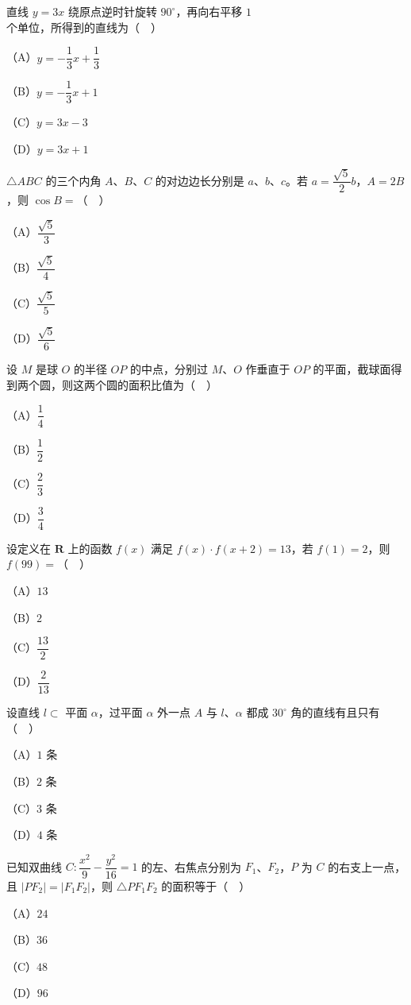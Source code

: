 \begin{question}
直线 $y=3x$ 绕原点逆时针旋转 $90^\circ$，再向右平移 $1$ 个单位，所得到的直线为（　）

（A）$y=-\dfrac13x+\dfrac13$

（B）$y=-\dfrac13x+1$

（C）$y=3x-3$

（D）$y=3x+1$

\end{question}
\begin{question}
$\triangle ABC$ 的三个内角 $A$、$B$、$C$ 的对边边长分别是 $a$、$b$、$c$。若 $a=\dfrac{\sqrt5}2b$，$A=2B$，则 $\cos B=$（　）

（A）$\dfrac{\sqrt5}3$

（B）$\dfrac{\sqrt5}4$

（C）$\dfrac{\sqrt5}5$

（D）$\dfrac{\sqrt5}6$

\end{question}
\begin{question}
设 $M$ 是球 $O$ 的半径 $OP$ 的中点，分别过 $M$、$O$ 作垂直于 $OP$ 的平面，截球面得到两个圆，则这两个圆的面积比值为（　）

（A）$\dfrac14$

（B）$\dfrac12$

（C）$\dfrac23$

（D）$\dfrac34$

\end{question}
\begin{question}
设定义在 $\mathbf R$ 上的函数 $f(x)$ 满足 $f(x)\cdot f(x+2)=13$，若 $f(1)=2$，则 $f(99)=$（　）

（A）$13$

（B）$2$

（C）$\dfrac{13}2$

（D）$\dfrac2{13}$

\end{question}
\begin{question}
设直线 $l\subset$ 平面 $\alpha$，过平面 $\alpha$ 外一点 $A$ 与 $l$、$\alpha$ 都成 $30^\circ$ 角的直线有且只有（　）

（A）$1$ 条

（B）$2$ 条

（C）$3$ 条

（D）$4$ 条

\end{question}
\begin{question}
已知双曲线 $C:\dfrac{x^2}9-\dfrac{y^2}{16}=1$ 的左、右焦点分别为 $F_1$、$F_2$，$P$ 为 $C$ 的右支上一点，且 $|PF_2|=|F_1F_2|$，则 $\triangle PF_1F_2$ 的面积等于（　）

（A）$24$

（B）$36$

（C）$48$

（D）$96$

\end{question}
